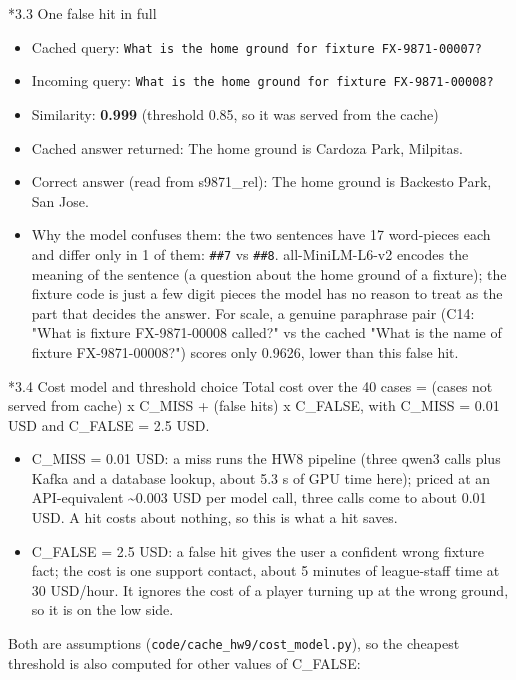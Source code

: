 \documentclass[11pt]{article}
\makeatletter
\renewcommand\subsection{\@startsection{subsection}{2}{\z@}{-2.2ex \@plus -1ex \@minus -.2ex}{0.8ex \@plus.2ex}{\normalfont\fontsize{12}{14.5}\selectfont\bfseries}}
\makeatother
\begin{document}
\subsection*{3.3 One false hit in full}
\begin{itemize}\setlength\itemsep{2pt}
\item Cached query: \texttt{What is the home ground for fixture FX-9871-00007?}
\item Incoming query: \texttt{What is the home ground for fixture FX-9871-00008?}
\item Similarity: \textbf{0.999} (threshold 0.85, so it was served from the cache)
\item Cached answer returned: The home ground is Cardoza Park, Milpitas.
\item Correct answer (read from s9871\_\allowbreak{}rel): The home ground is Backesto Park, San Jose.
\item Why the model confuses them: the two sentences have 17 word-pieces each and differ only in 1 of them: \texttt{\#\#7} vs \texttt{\#\#8}. all-MiniLM-L6-v2 encodes the meaning of the sentence (a question about the home ground of a fixture); the fixture code is just a few digit pieces the model has no reason to treat as the part that decides the answer. For scale, a genuine paraphrase pair (C14: "What is fixture FX-9871-00008 called?" vs the cached "What is the name of fixture FX-9871-00008?") scores only 0.9626, lower than this false hit.
\end{itemize}
\subsection*{3.4 Cost model and threshold choice}
Total cost over the 40 cases = (cases not served from cache) x C\_\allowbreak{}MISS + (false hits) x C\_\allowbreak{}FALSE, with C\_\allowbreak{}MISS = 0.01 USD and C\_\allowbreak{}FALSE = 2.5 USD.

\begin{itemize}\setlength\itemsep{2pt}
\item C\_\allowbreak{}MISS = 0.01 USD: a miss runs the HW8 pipeline (three qwen3 calls plus Kafka and a database lookup, about 5.3 s of GPU time here); priced at an API-equivalent \textasciitilde{}0.003 USD per model call, three calls come to about 0.01 USD. A hit costs about nothing, so this is what a hit saves.
\item C\_\allowbreak{}FALSE = 2.5 USD: a false hit gives the user a confident wrong fixture fact; the cost is one support contact, about 5 minutes of league-staff time at 30 USD/hour. It ignores the cost of a player turning up at the wrong ground, so it is on the low side.
\end{itemize}
Both are assumptions (\texttt{code/\allowbreak{}cache\_\allowbreak{}hw9/\allowbreak{}cost\_\allowbreak{}model.py}), so the cheapest threshold is also computed for other values of C\_\allowbreak{}FALSE:
\end{document}
